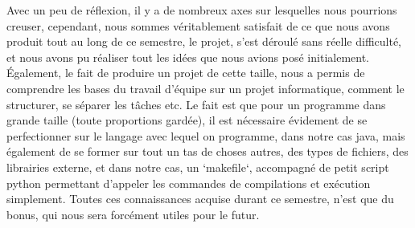 \documentclass[12pt]{article}
\begin{document}
Avec un peu de réflexion, il y a de nombreux axes sur lesquelles nous pourrions creuser, cependant, nous sommes véritablement satisfait de ce que nous avons produit tout au long de ce semestre, le projet, s’est déroulé sans réelle difficulté, et nous avons pu réaliser tout les idées que nous avions posé initialement. Également, le fait de produire un projet de cette taille, nous a permis de comprendre les bases du travail d’équipe sur un projet informatique, comment le structurer, se séparer les tâches etc. Le fait est que pour un programme dans grande taille (toute proportions gardée), il est nécessaire évidement de se perfectionner sur le langage avec lequel on programme, dans notre cas java, mais également de se former sur tout un tas de choses autres, des types de fichiers, des librairies externe, et dans notre cas, un `makefile`, accompagné de petit script python permettant d’appeler les commandes de compilations et exécution simplement. Toutes ces connaissances acquise durant ce semestre, n’est que du bonus, qui nous sera forcément utiles pour le futur.
\end{document}
